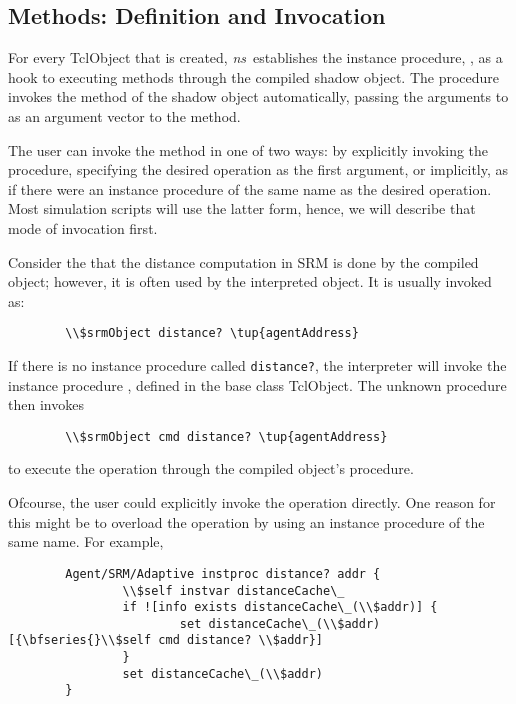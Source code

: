 \subsection{ Methods: Definition and Invocation}
\label{sec:Commands}

For every TclObject that is created, \emph{ns}\ establishes
the instance procedure, ,
as a hook to executing methods through the compiled shadow object.
The procedure  invokes the method 
of the shadow object automatically, passing the arguments to 
as an argument vector to the  method.

The user can invoke the  method in one of two ways:
by explicitly invoking the procedure, specifying the desired
operation as the first argument, or
implicitly, as if there were an instance procedure of the same name as the
desired operation.
Most simulation scripts will use the latter form, hence, we will
describe that mode of invocation first.

Consider the that the distance computation in SRM is done by
the compiled object; however, it is often used by the interpreted object.
It is usually invoked as:
\begin{verbatim}
        \\$srmObject distance? \tup{agentAddress}
\end{verbatim}
If there is no instance procedure called {\tt distance?},
the interpreter will invoke the instance procedure
, defined in the base class TclObject.
The unknown procedure then invokes
\begin{verbatim}
        \\$srmObject cmd distance? \tup{agentAddress}
\end{verbatim}
to execute the operation through the compiled object's
 procedure.

Ofcourse, the user could explicitly invoke the operation directly.
One reason for this might be to overload the operation by using
an instance procedure of the same name.
For example,
\begin{verbatim}
        Agent/SRM/Adaptive instproc distance? addr {
                \\$self instvar distanceCache\_
                if ![info exists distanceCache\_(\\$addr)] {
                        set distanceCache\_(\\$addr) [{\bfseries{}\\$self cmd distance? \\$addr}]
                }
                set distanceCache\_(\\$addr)
        }
\end{verbatim}

